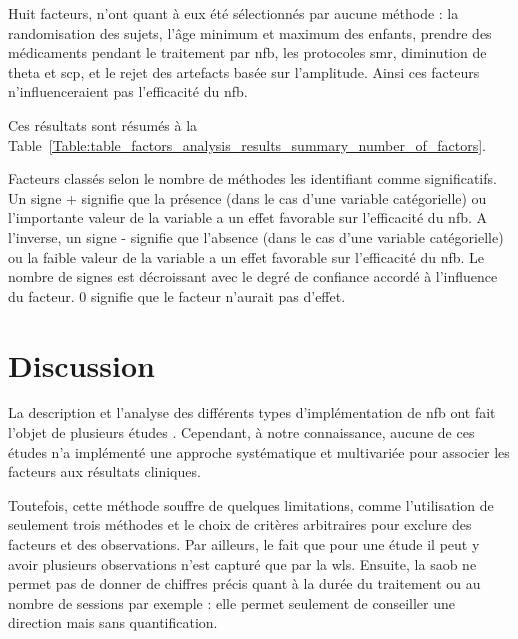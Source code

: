 Huit facteurs, n'ont quant à eux été sélectionnés par aucune méthode : la randomisation des sujets, l'âge minimum et maximum des enfants, prendre des 
médicaments pendant le traitement par \gls{nfb}, les protocoles \gls{smr}, diminution de theta et \gls{scp}, et le rejet
des artefacts basée sur l'amplitude. Ainsi ces facteurs n'influenceraient pas l'efficacité du \gls{nfb}. 

Ces résultats sont résumés à la Table~\ref{Table:table_factors_analysis_results_summary_number_of_factors}.

\begin{table}[h!]
  \centering
  \caption[Facteurs classés selon le nombre de méthodes les identifiant comme significatifs.]{Facteurs classés selon le nombre de méthodes les identifiant comme significatifs. Un signe + signifie que la présence (dans le cas d'une variable catégorielle) ou l'importante valeur
	de la variable a un effet favorable sur l'efficacité du \gls{nfb}. A l'inverse, un signe - signifie que l'absence (dans le cas d'une variable catégorielle) ou la faible valeur
	de la variable a un effet favorable sur l'efficacité du \gls{nfb}. Le nombre de signes est décroissant avec le degré de confiance accordé à l'influence du facteur. 0 signifie 
	que le facteur n'aurait pas d'effet.}
  
  \label{Table:table_factors_analysis_results_summary_number_of_factors}
\end{table}

\section{Discussion}

La description et l'analyse des différents types d'implémentation de \gls{nfb} ont fait l'objet de plusieurs études \citep{Arns2014, 
Jeunet2018, Arns2009, Cortese2016, Alkoby2017, Rogala2016, Enriquez2017}. Cependant, à notre connaissance, aucune de ces études n'a implémenté une approche systématique et 
multivariée pour associer les facteurs aux résultats cliniques. 

Toutefois, cette méthode souffre de quelques limitations, comme 
l'utilisation de seulement trois méthodes et le choix de critères arbitraires pour exclure des facteurs et des observations. Par ailleurs, le fait que pour une étude il peut y 
avoir plusieurs observations n'est capturé que par la \gls{wls}. Ensuite, la \gls{saob} ne permet pas de donner de chiffres précis quant à la durée du traitement ou au 
nombre de sessions par exemple : elle permet seulement de conseiller une direction mais sans quantification.

